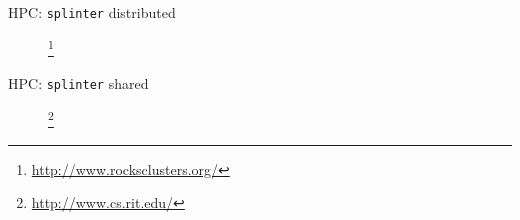 \documentclass{beamer}
\begin{document}
\begin{frame}{HPC: \texttt{splinter} distributed}
  \begin{figure}
    \begin{center}
      \footnote{\url{http://www.rocksclusters.org/}}
    \end{center}
  \end{figure}
\end{frame}

\begin{frame}{HPC: \texttt{splinter} shared}
  \begin{figure}
    \begin{center}
      \footnote{\url{http://www.cs.rit.edu/}}
    \end{center}
  \end{figure}
\end{frame}
\end{document}
